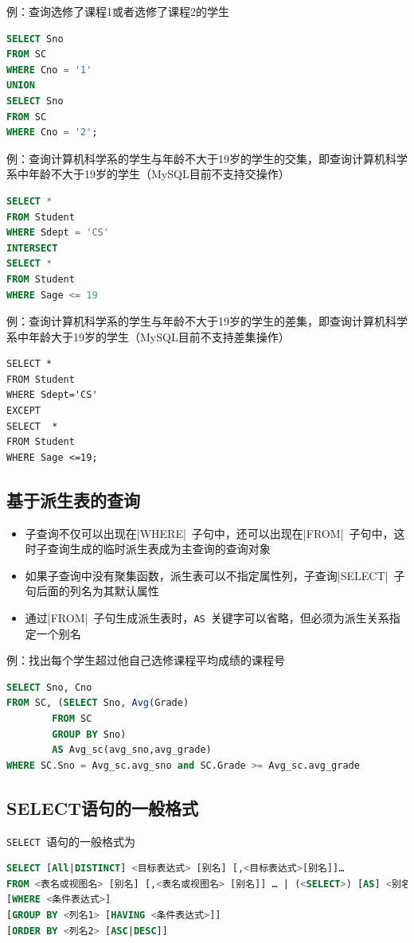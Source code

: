 例：查询选修了课程1或者选修了课程2的学生
\begin{lstlisting}[language=sql]
SELECT Sno
FROM SC
WHERE Cno = '1'
UNION
SELECT Sno
FROM SC
WHERE Cno = '2';
\end{lstlisting}

例：查询计算机科学系的学生与年龄不大于19岁的学生的交集，即查询计算机科学系中年龄不大于19岁的学生（MySQL目前不支持交操作）
\begin{lstlisting}[language=sql]
SELECT *
FROM Student
WHERE Sdept = 'CS' 
INTERSECT
SELECT *
FROM Student
WHERE Sage <= 19 
\end{lstlisting}

例：查询计算机科学系的学生与年龄不大于19岁的学生的差集，即查询计算机科学系中年龄大于19岁的学生（MySQL目前不支持差集操作）
\begin{lstlisting}
SELECT *
FROM Student
WHERE Sdept='CS'
EXCEPT
SELECT  *
FROM Student
WHERE Sage <=19;
\end{lstlisting}

\subsection{基于派生表的查询}
\begin{itemize}
    \item 子查询不仅可以出现在\sverb|WHERE|\ 子句中，还可以出现在\sverb|FROM|\ 子句中，这时子查询生成的临时派生表成为主查询的查询对象
    \item 如果子查询中没有聚集函数，派生表可以不指定属性列，子查询\sverb|SELECT|\ 子句后面的列名为其默认属性
    \item 通过\sverb|FROM|\ 子句生成派生表时，\verb|AS|\ 关键字可以省略，但必须为派生关系指定一个别名
\end{itemize}

例：找出每个学生超过他自己选修课程平均成绩的课程号
\begin{lstlisting}[language=sql]
SELECT Sno, Cno
FROM SC, (SELECT Sno, Avg(Grade) 
        FROM SC
    	GROUP BY Sno)
        AS Avg_sc(avg_sno,avg_grade)
WHERE SC.Sno = Avg_sc.avg_sno and SC.Grade >= Avg_sc.avg_grade
\end{lstlisting}

\subsection{SELECT语句的一般格式}
\verb|SELECT|\ 语句的一般格式为
\begin{lstlisting}[language=sql]
SELECT [All|DISTINCT] <目标表达式> [别名] [,<目标表达式>[别名]]…
FROM <表名或视图名> [别名] [,<表名或视图名> [别名]] … | (<SELECT>) [AS] <别名>
[WHERE <条件表达式>]
[GROUP BY <列名1> [HAVING <条件表达式>]]
[ORDER BY <列名2> [ASC|DESC]]
\end{lstlisting}

